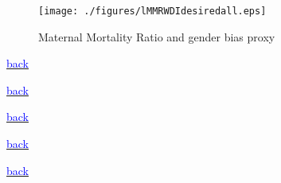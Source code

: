 \documentclass[10pt,letterpaper,subeqn]{beamer}
\begin{document}
\begin{frame}[label=MMRBias,plain]
\begin{figure}
\caption{Maternal Mortality Ratio and gender bias proxy}
\texttt{[image: ./figures/lMMRWDIdesiredall.eps]}
\end{figure}
\vspace{-8mm}
{\footnotesize \hyperlink{CC1}{\textcolor{blue}{back}}}
\end{frame}

\begin{frame}[label=MissionsTab]
\vspace{1cm}

\vspace{1cm}
{\footnotesize \hyperlink{missions}{\textcolor{blue}{back}}}
\end{frame}

\begin{frame}[label=placebo1]

{\footnotesize \hyperlink{placebos}{\textcolor{blue}{back}}}
\end{frame}

\begin{frame}[label=placebo2]

{\footnotesize \hyperlink{placebos}{\textcolor{blue}{back}}}
\end{frame}

\begin{frame}[plain,label=placebo3]

{\footnotesize \hyperlink{placebos}{\textcolor{blue}{back}}}
\end{frame}
\end{document}
